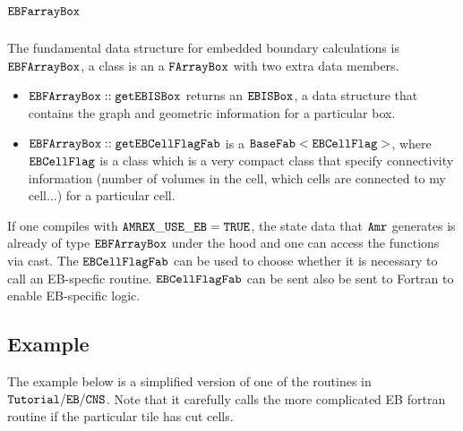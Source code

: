 \section{$\tt{EBFarrayBox}$}

The fundamental data structure for embedded boundary calculations is 
$\tt{EBFArrayBox}$, a class is an a $\tt{FArrayBox}$ with two extra
data members.
\begin{itemize}
\item $\tt{EBFArrayBox::getEBISBox}$ returns an $\tt{EBISBox}$, a data
  structure that contains the graph and geometric information for a
  particular box.
\item $\tt{EBFArrayBox::getEBCellFlagFab}$  is a
  $\tt{BaseFab<EBCellFlag>}$, where $\tt{EBCellFlag}$ is a class which
  is a very compact class that specify connectivity information
  (number of volumes in the cell, which cells are connected to my
  cell...) for a particular cell.
\end{itemize}
If one compiles with $\tt{AMREX\_USE\_EB = TRUE}$, the state data that
${\tt Amr}$ generates is already of type $\tt{EBFArrayBox}$ under the
hood and one can access the functions via cast.   The
$\tt{EBCellFlagFab}$ can be used to choose whether it is necessary to call an
EB-specfic routine. $\tt{EBCellFlagFab}$  can be sent also be sent to Fortran to 
enable EB-specific logic.   

\subsection{Example}
The example below is a simplified version
of one of the routines in $\tt{Tutorial/EB/CNS}$.   Note  that  it
carefully calls the more complicated EB fortran routine if the
particular tile has cut cells.


